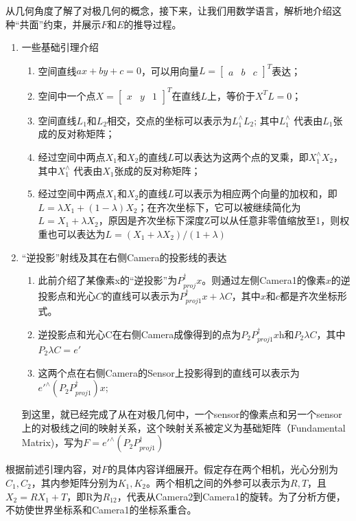 从几何角度了解了对极几何的概念，接下来，让我们用数学语言，解析地介绍这种“共面”约束，并展示$F$和$E$的推导过程。
\begin{enumerate}
\item 一些基础引理介绍
	\begin{enumerate}
		\item 空间直线$ax+by+c=0$，可以用向量$L = \left[ \begin{array}{ccc} a & b & c \end{array} \right]^{T}$表达；
		\item 空间中一个点$X=  \left[ \begin{array}{ccc} x & y & 1 \end{array} \right]^{T}$在直线$L$上，等价于$X^{T}L=0$；
		\item 空间直线$L_1$和$L_2$相交，交点的坐标可以表示为$L_1^{\wedge} L_2$; 其中$L_1^{\wedge}$ 代表由$L_1$张成的反对称矩阵；
		\item 经过空间中两点$X_1$和$X_2$的直线$L$可以表达为这两个点的叉乘，即$X_1^{\wedge} X_2$，其中$X_1^{\wedge}$ 代表由$X_1$张成的反对称矩阵；
		\item 经过空间中两点$X_1$和$X_2$的直线$L$可以表示为相应两个向量的加权和，即$L = \lambda X_1 + (1-\lambda )X_2$；在齐次坐标下，它可以被继续简化为$L =X_1 + \lambda X_2$，原因是齐次坐标下深度Z可以从任意非零值缩放至1，则权重也可以表达为$L =\left(X_1 + \lambda X_2\right)/\left(1+\lambda\right)$
	\end{enumerate}


\item “逆投影”射线及其在右侧Camera的投影线的表达\par
	\begin{enumerate}
	\item 此前介绍了某像素x的“逆投影”为$P_{proj}^\dagger x $。则通过左侧Camera1的像素$x$的逆投影点和光心$C$的直线可以表示为$P_{proj1}^\dagger x  + \lambda C$，其中$x$和$ c$都是齐次坐标形式。
	\item 逆投影点和光心C在右侧Camera成像得到的点为$P_2 P_{proj1}^\dagger x$h和$P_2 \lambda C$，其中$P_2 \lambda C=e'$
	\item 这两个点在右侧Camera的Sensor上投影得到的直线可以表示为$e'^{\wedge}(P_2 P_{proj1}^\dagger) x$;
	\end{enumerate}
	到这里，就已经完成了从在对极几何中，一个sensor的像素点和另一个sensor上的对极线之间的映射关系，这个映射关系被定义为基础矩阵（Fundamental Matrix)，写为$F=e'^{\wedge}(P_2 P_{proj1}^\dagger) $
\end{enumerate}
根据前述引理内容，对$F$的具体内容详细展开。假定存在两个相机，光心分别为$C_1 , C_2$，其内参矩阵分别为$K_1, K_2$。两个相机之间的外参可以表示为$R, T$，且$X_2=RX_1+T$，即R为$R_{12}$，代表从Camera2到Camera1的旋转。为了分析方便，不妨使世界坐标系和Camera1的坐标系重合。\par
